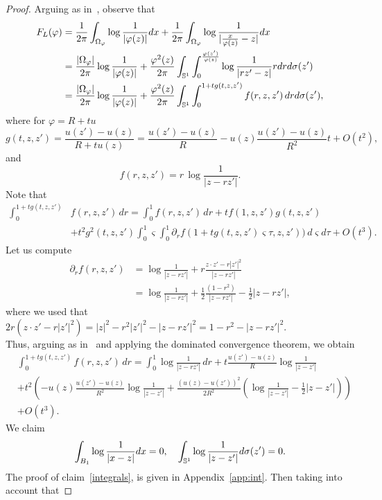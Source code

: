 \documentclass[10pt,reqno,english]{amsart}
\newcommand{\be}{\begin{equation}}
\newcommand{\ee}{\end{equation}}
\theoremstyle{definition}
\numberwithin{equation}{section}
\begin{document}
\begin{proof}
Arguing as in~\cite[Lemma 15]{Fr19}, observe that
\begin{align*}
    F_L  (\varphi) &= {1\over 2\pi} \int_{\Omega_\varphi} \log {1\over |\varphi (z) |} dx + {1\over 2\pi} \int_{\Omega_\varphi} \log {1\over |{x\over \varphi (z)} - z |} dx\\
    &= {|\Omega_\varphi | \over 2\pi} \log {1\over |\varphi (z) |} + {\varphi^2 (z) \over 2\pi} \int_{\mathbb {S}^1} \int_0^{\varphi (z') \over \varphi (z)} \log {1 \over |r z' - z |} r d r d\sigma (z')\\
    &= {|\Omega_\varphi | \over 2\pi} \log {1\over |\varphi (z) |} + {\varphi^2 (z) \over 2\pi} \int_{\mathbb {S}^1}\int_0^{1+tg(t,z,z')}f(r,z,z')\,drd\sigma(z'),
\end{align*}
  where for $\varphi=R+tu$
    \[
    g(t,z,z')=\frac{u(z')-u(z)}{R+tu(z)}=\frac{u(z')-u(z)}{R}-u(z)\frac{u(z')-u(z)}{R^2}t+O(t^2),
    \]
    and
    \[
    f(r,z,z')=r\,\log\frac{1}{|z-rz'|}.
    \]
Note that
    \begin{align*}
\int_0^{1+tg(t,z,z')}&f(r,z,z')\,dr=\int_0^1f(r,z,z')\,dr+tf(1,z,z')g(t,z,z')\\
& +t^2g^2(t,z,z')\int_0^1\varsigma\int_0^1\partial_rf(1+t g(t,z,z')\varsigma\tau,z,z'))\,d\varsigma d\tau+ O(t^3).
    \end{align*}
Let us compute
\begin{align*}
    \partial_rf(r,z,z')&=\log\frac{1}{|z-rz'|}+ r\frac{z\cdot z'-r|z'|^2}{|z-rz'|}\\
&=\log\frac{1}{|z-rz'|}+\frac{1}{2}\frac{(1-r^2)}{|z-rz'|}-\frac{1}{2}|z-rz'|,
\end{align*}
where we used that $2r(z\cdot z'-r|z'|^2)=|z|^2-r^2|z'|^2-|z-rz'|^2=1-r^2-|z-rz'|^2$.\\
Thus, arguing as in~\cite[Lemma 15]{Fr19} and applying the dominated convergence theorem, we obtain
\begin{align*}
&\int_0^{1+tg(t,z,z')}f(r,z,z')\,dr=\int_0^1\log\frac{1}{|z-rz'|}\,dr+t\frac{u(z')-u(z)}{R}\log\frac{1}{|z-z'|}\\
&+t^2\left(-u(z)\frac{u(z')-u(z)}{R^2}\log\frac{1}{|z-z'|}+\frac{(u(z)-u(z'))^2}{2R^2}\left(\log\frac{1}{|z-z'|}-\frac12|z-z'|\right)\right)\\
&+O(t^3).
\end{align*}
We claim 
\be \label{integrals}
\int_{B_1} \log {1\over |x-z|} dx =0, \quad \int_{\mathbb{S}^1} \log {1\over |z-z'|} d\sigma (z') =0.
\ee
The proof of claim~\eqref{integrals}, is given in Appendix~\ref{app:int}. Then taking into account that

\end{proof}
\end{document}
